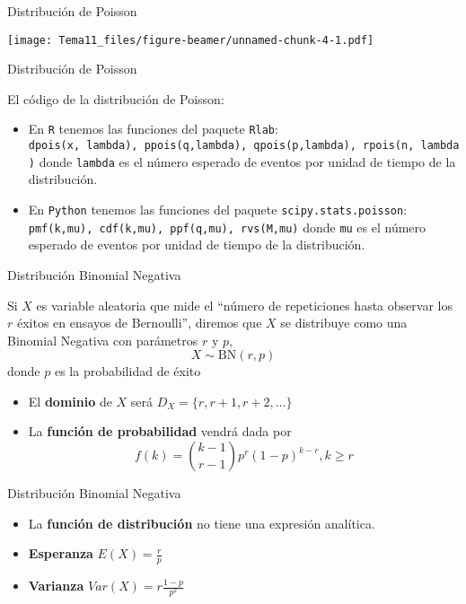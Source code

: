 \documentclass[
  ignorenonframetext,
]{beamer}
\providecommand{\tightlist}{%
  \setlength{\itemsep}{0pt}\setlength{\parskip}{0pt}}
\begin{document}
\begin{frame}{Distribución de Poisson}
\protect\hypertarget{distribuciuxf3n-de-poisson-2}{}

\texttt{[image: Tema11\_files/figure-beamer/unnamed-chunk-4-1.pdf]}

\end{frame}

\begin{frame}[fragile]{Distribución de Poisson}
\protect\hypertarget{distribuciuxf3n-de-poisson-3}{}

El código de la distribución de Poisson:

\begin{itemize}
\tightlist
\item
  En \texttt{R} tenemos las funciones del paquete \texttt{Rlab}:
  \texttt{dpois(x,\ lambda),\ ppois(q,lambda),\ qpois(p,lambda),\ rpois(n,\ lambda)}
  donde \texttt{lambda} es el número esperado de eventos por unidad de
  tiempo de la distribución.
\item
  En \texttt{Python} tenemos las funciones del paquete
  \texttt{scipy.stats.poisson}:
  \texttt{pmf(k,mu),\ cdf(k,mu),\ ppf(q,mu),\ rvs(M,mu)} donde
  \texttt{mu} es el número esperado de eventos por unidad de tiempo de
  la distribución.
\end{itemize}

\end{frame}

\begin{frame}{Distribución Binomial Negativa}
\protect\hypertarget{distribuciuxf3n-binomial-negativa}{}

Si \(X\) es variable aleatoria que mide el ``número de repeticiones
hasta observar los \(r\) éxitos en ensayos de Bernoulli'', diremos que
\(X\) se distribuye como una Binomial Negativa con parámetros \(r\) y
\(p\), \[X\sim\text{BN}(r,p)\] donde \(p\) es la probabilidad de éxito

\begin{itemize}
\tightlist
\item
  El \textbf{dominio} de \(X\) será \(D_X = \{r, r+1, r+2,\dots\}\)
\item
  La \textbf{función de probabilidad} vendrá dada por
  \[f(k) = {k-1\choose r-1}p^r(1-p)^{k-r}, k\geq r\]
\end{itemize}

\end{frame}

\begin{frame}{Distribución Binomial Negativa}
\protect\hypertarget{distribuciuxf3n-binomial-negativa-1}{}

\begin{itemize}
\tightlist
\item
  La \textbf{función de distribución} no tiene una expresión analítica.
\item
  \textbf{Esperanza} \(E(X) = \frac{r}{p}\)
\item
  \textbf{Varianza} \(Var(X) = r\frac{1-p}{p^2}\)
\end{itemize}

\end{frame}
\end{document}

